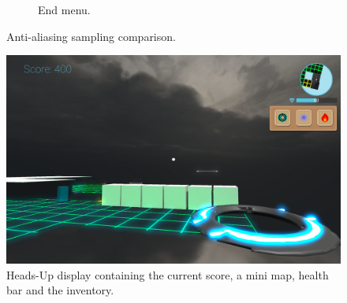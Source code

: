 \documentclass[a4paper]{article}
\begin{document}
\begin{figure}[H]
\begin{subfigure}[b]{0.33\linewidth}
          \caption{End menu.}
      \end{subfigure}
      \caption{Anti-aliasing sampling comparison.}
      \label{fig:animals}
  \end{figure}

  \begin{figure}[H]
      \begin{center}
          \includegraphics[width=\linewidth]{HUD.jpg}

      \end{center}
      \caption{Heads-Up display containing the current score, a mini map, health bar and the inventory. }
  \end{figure}
\end{document}

